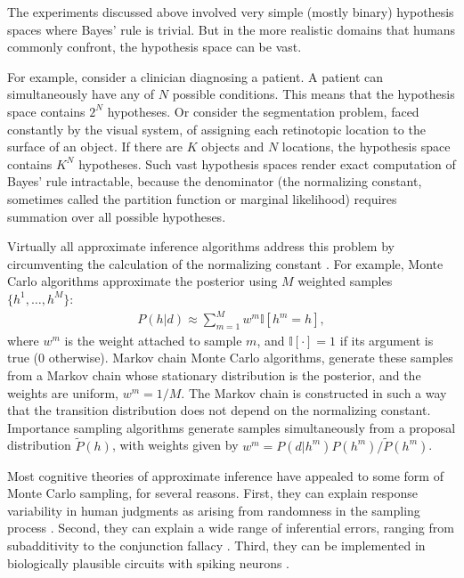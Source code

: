 The experiments discussed above involved very simple (mostly binary) hypothesis spaces where Bayes' rule is trivial. But in the more realistic domains that humans commonly confront, the hypothesis space can be vast. 

For example, consider a clinician diagnosing a patient. A patient can simultaneously have any of $N$ possible conditions. This means that the hypothesis space contains $2^N$ hypotheses. Or consider the segmentation problem, faced constantly by the visual system, of assigning each retinotopic location to the surface of an object. If there are $K$ objects and $N$ locations, the hypothesis space contains $K^N$ hypotheses. Such vast hypothesis spaces render exact computation of Bayes' rule intractable, because the denominator (the normalizing constant, sometimes called the partition function or marginal likelihood) requires summation over all possible hypotheses.

Virtually all approximate inference algorithms address this problem by circumventing the calculation of the normalizing constant \citep{gershman2017complex}. For example, Monte Carlo algorithms \citep{andrieu2003introduction} approximate the posterior using $M$ weighted samples $\{h^1,\ldots,h^M\}$:
\begin{align}
    P(h|d) \approx \sum_{m=1}^M w^m \mathbb{I}[h^m = h],
    \label{eq:montecarlo}
\end{align}
where $w^m$ is the weight attached to sample $m$, and $\mathbb{I}[\cdot]=1$ if its argument is true (0 otherwise). Markov chain Monte Carlo algorithms, generate these samples from a Markov chain whose stationary distribution is the posterior, and the weights are uniform, $w^m = 1/M$. The Markov chain is constructed in such a way that the transition distribution does not depend on the normalizing constant. Importance sampling algorithms generate samples simultaneously from a proposal distribution $\tilde{P}(h)$, with weights given by $w^m = P(d|h^m)P(h^m)/\tilde{P}(h^m)$.

Most cognitive theories of approximate inference have appealed to some form of Monte Carlo sampling, for several reasons. First, they can explain response variability in human judgments as arising from randomness in the sampling process \citep{denison2013rational,vul2014one,gershman2012multistability}. Second, they can explain a wide range of inferential errors, ranging from subadditivity to the conjunction fallacy \citep{sanborn2016bayesian,dasgupta2017hypotheses}. Third, they can be implemented in biologically plausible circuits with spiking neurons \citep{buesing2011neural,orban2016neural,haefner2016perceptual}.

